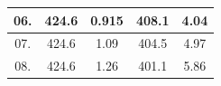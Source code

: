 \documentclass[a4paper,12pt]{article}
\begin{document}
\begin{table}[H]
\begin{tabular}{|c|c|c|c|c|}
			06.              & 424.6                                                                     & 0.915                                                              & 408.1                                                                  & 4.04                                                                \\ \hline
			07.              & 424.6                                                                     & 1.09                                                               & 404.5                                                                  & 4.97                                                                \\ \hline
			08.              & 424.6                                                                     & 1.26                                                               & 401.1                                                                  & 5.86                                                                \\ \hline
		\end{tabular}
	\end{table}
	
\end{document}
